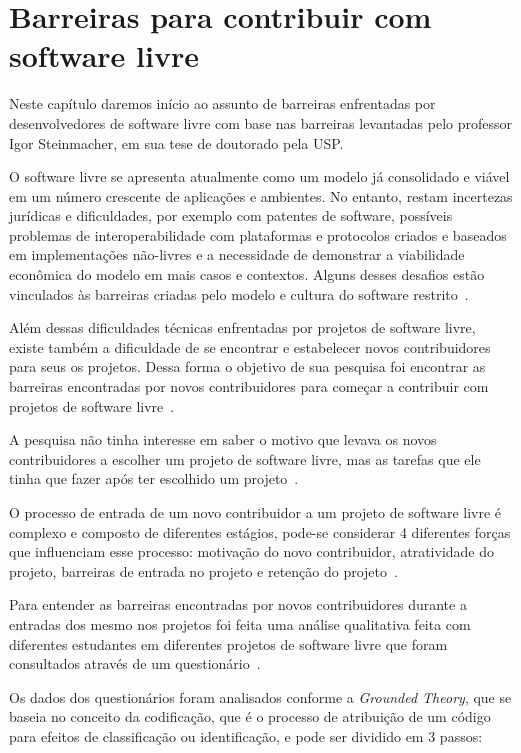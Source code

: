 \chapter{Barreiras para contribuir com software livre}
\label{barreirasSL}

Neste capítulo daremos início ao assunto de barreiras enfrentadas por desenvolvedores
de software livre com base nas barreiras levantadas pelo professor Igor Steinmacher, 
em sua tese de doutorado pela USP.

O software livre se apresenta atualmente como um modelo já consolidado e viável
em um número crescente de aplicações e ambientes. No entanto, restam incertezas
jurídicas e dificuldades, por exemplo com patentes de software, possíveis problemas de
interoperabilidade com plataformas e protocolos criados e baseados em implementações
não-livres e a necessidade de demonstrar a viabilidade econômica do modelo em mais
casos e contextos. Alguns desses desafios estão vinculados às barreiras criadas pelo
modelo e cultura do software restrito~\cite{kon2012software}.

Além dessas dificuldades técnicas enfrentadas por projetos de software livre, existe 
também a dificuldade de se encontrar e estabelecer novos contribuidores para seus os
projetos. Dessa forma o objetivo de sua pesquisa foi encontrar as barreiras encontradas 
por novos contribuidores para começar a contribuir com projetos de software livre~\cite{Steinmacher:2015:SLR:2729291.2729410}.

A pesquisa não tinha interesse em saber o motivo que levava os novos contribuidores
a escolher um projeto de software livre, mas as tarefas que ele tinha que fazer após
ter escolhido um projeto~\cite{Steinmacher:2015:SLR:2729291.2729410}.

O processo de entrada de um novo contribuidor a um projeto de software livre é complexo
e composto de diferentes estágios, pode-se considerar 4 diferentes forças que influenciam 
esse processo: motivação do novo contribuidor, atratividade do projeto, barreiras de entrada
no projeto e retenção do projeto~\cite{Steinmacher:2014:HLO:2593702.2593704, 2049}.

Para entender as barreiras encontradas por novos contribuidores durante a entradas dos
mesmo nos projetos foi feita uma análise qualitativa feita com diferentes estudantes em
diferentes projetos de software livre que foram consultados através de um questionário~\cite{Steinmacher:2014:HLO:2593702.2593704}.

Os dados dos questionários foram analisados conforme a \textit{Grounded Theory},
que se baseia no conceito da codificação, que é o processo de atribuição de um código
para efeitos de classificação ou identificação, e pode ser dividido em 3 passos:

